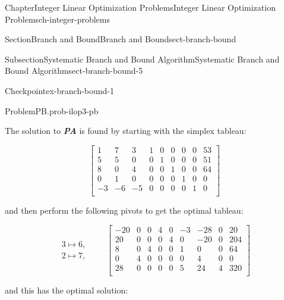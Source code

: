 \documentclass[oneside,10pt,]{book}
\newcommand{\alert}[1]{\textbf{\textit{#1}}}
\numberwithin{equation}{section}
\newcommand{\amp}{&}
\begin{document}
\begin{chapterptx}{Chapter}{Integer Linear Optimization Problems}{}{Integer Linear Optimization Problems}{}{}{ch-integer-problems}
\begin{sectionptx}{Section}{Branch and Bound}{}{Branch and Bound}{}{}{sect-branch-bound}
\begin{subsectionptx}{Subsection}{Systematic Branch and Bound Algorithm}{}{Systematic Branch and Bound Algorithm}{}{}{sect-branch-bound-5}
\begin{inlineexercise}{Checkpoint}{}{ex-branch-bound-1}
\begin{problem}{Problem}{PB.}{prob-ilop3-pb}
\begin{equation*}
\end{equation*}
%
\end{problem}
The solution to \alert{PA} is found by starting with the simplex tableau:%
\par
%
\begin{equation*}
\left[\begin{array}{rrr|rrrrr|r} 1 \amp 7 \amp 3 \amp 1 \amp 0 \amp 0 \amp 0 \amp 0 \amp 53\\ 5 \amp 5 \amp 0 \amp 0 \amp 1 \amp 0 \amp 0 \amp 0 \amp 51\\ 8 \amp 0 \amp 4 \amp 0 \amp 0 \amp 1 \amp 0 \amp 0 \amp 64\\ 0 \amp 1 \amp 0 \amp 0 \amp 0 \amp 0 \amp 1 \amp 0 \amp 0\\ \hline -3 \amp -6 \amp -5 \amp 0 \amp 0 \amp 0 \amp 0 \amp 1 \amp 0\\ \end{array} \right]
\end{equation*}
%
\par
and then perform the following pivots to get the optimal tableau:%
\par
%
\begin{equation*}
\begin{array}{r} 3 \mapsto 6, \\ 2 \mapsto 7, \end{array} \qquad \left[\begin{array}{rrr|rrrrr|r} -20 \amp 0 \amp 0 \amp 4 \amp 0 \amp -3 \amp -28 \amp 0 \amp 20\\ 20 \amp 0 \amp 0 \amp 0 \amp 4 \amp 0 \amp -20 \amp 0 \amp 204\\ 8 \amp 0 \amp 4 \amp 0 \amp 0 \amp 1 \amp 0 \amp 0 \amp 64\\ 0 \amp 4 \amp 0 \amp 0 \amp 0 \amp 0 \amp 4 \amp 0 \amp 0\\ \hline 28 \amp 0 \amp 0 \amp 0 \amp 0 \amp 5 \amp 24 \amp 4 \amp 320\\ \end{array} \right]
\end{equation*}
%
\par
and this has the optimal solution:%
\par
%
\begin{equation*}

\end{equation*}
\end{inlineexercise}
\end{subsectionptx}
\end{sectionptx}
\end{chapterptx}
\end{document}
